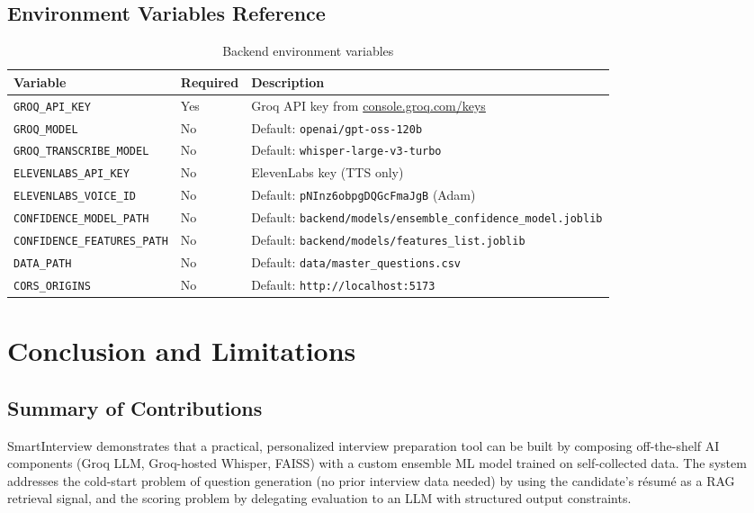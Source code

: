 \documentclass[12pt,a4paper]{article}
\begin{document}
\subsection{Environment Variables Reference}

\begin{table}[H]
\centering
\caption{Backend environment variables}
\small
\begin{tabularx}{\textwidth}{l l X}
\toprule
\textbf{Variable} & \textbf{Required} & \textbf{Description} \\
\midrule
\texttt{GROQ\_API\_KEY} & Yes & Groq API key from \href{https://console.groq.com/keys}{console.groq.com/keys} \\
\texttt{GROQ\_MODEL} & No & Default: \texttt{openai/gpt-oss-120b} \\
\texttt{GROQ\_TRANSCRIBE\_MODEL} & No & Default: \texttt{whisper-large-v3-turbo} \\
\texttt{ELEVENLABS\_API\_KEY} & No & ElevenLabs key (TTS only) \\
\texttt{ELEVENLABS\_VOICE\_ID} & No & Default: \texttt{pNInz6obpgDQGcFmaJgB} (Adam) \\
\texttt{CONFIDENCE\_MODEL\_PATH} & No & Default: \texttt{backend/models/ensemble\_confidence\_model.joblib} \\
\texttt{CONFIDENCE\_FEATURES\_PATH} & No & Default: \texttt{backend/models/features\_list.joblib} \\
\texttt{DATA\_PATH} & No & Default: \texttt{data/master\_questions.csv} \\
\texttt{CORS\_ORIGINS} & No & Default: \texttt{http://localhost:5173} \\
\bottomrule
\end{tabularx}
\end{table}

\section{Conclusion and Limitations}

\subsection{Summary of Contributions}

SmartInterview demonstrates that a practical, personalized interview preparation tool can be built by composing off-the-shelf AI components (Groq LLM, Groq-hosted Whisper, FAISS) with a custom ensemble ML model trained on self-collected data. The system addresses the cold-start problem of question generation (no prior interview data needed) by using the candidate's r\'esum\'e as a RAG retrieval signal, and the scoring problem by delegating evaluation to an LLM with structured output constraints.
\end{document}
